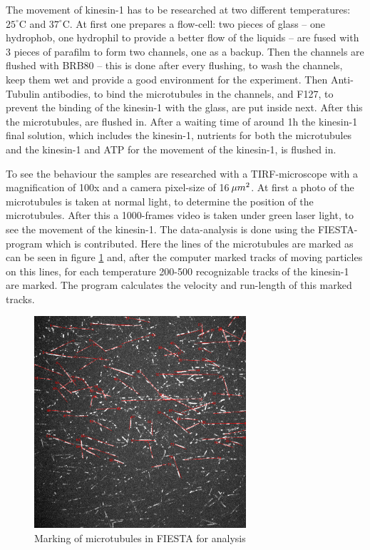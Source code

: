 \documentclass[english, %
parskip=full, %
bibliography=totoc, %
]{scrartcl}
\begin{document}
The movement of kinesin-1 has to be researched at two different temperatures: $25^\circ\text{C}$ and $37^\circ\text{C}$.
At first one prepares a flow-cell: two pieces of glass – one hydrophob, one hydrophil to provide a better flow of the liquids – are fused with 3 pieces of parafilm to form two channels, one as a backup. Then the channels are flushed with BRB80 – this is done after every flushing, to wash the channels, keep them wet and provide a good environment for the experiment. Then Anti-Tubulin antibodies, to bind the microtubules in the channels, and F127, to prevent the binding of the kinesin-1 with the glass, are put inside next. After this the microtubules, are flushed in. After a waiting time of around 1h the kinesin-1 final solution, which includes the kinesin-1, nutrients for both the microtubules and the kinesin-1 and ATP for the movement of the kinesin-1, is flushed in.

To see the behaviour the samples are researched with a TIRF-microscope with a magnification of 100x and a camera pixel-size of 16\,$\mu m\textsuperscript{2}$. At first a photo of the microtubules is taken at normal light, to determine the position of the microtubules. After this a 1000-frames video is taken under green laser light, to see the movement of the kinesin-1. The data-analysis is done using the FIESTA-program which is contributed. Here the lines of the microtubules are marked as can be seen in figure \ref{fig:marking} and, after the computer marked tracks of moving particles on this lines, for each temperature 200-500 recognizable tracks of the kinesin-1 are marked. The program calculates the velocity and run-length of this marked tracks.

\begin{figure}[!ht] 
  \centering
     \includegraphics[width=0.7\textwidth]{kinesin_marking}
  \caption{Marking of microtubules in FIESTA for analysis}
  \label{fig:marking}
\end{figure}
\end{document}
